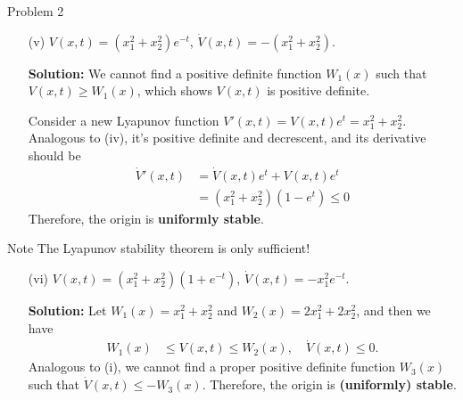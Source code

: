 \documentclass[8pt]{beamer}
\begin{document}
\begin{frame}[t]{Problem 2}
  \begin{itemize}
    \item[(v)] $V(x,t)=(x_1^2+x_2^2)e^{-t}$, $\dot V(x,t)=-(x_1^2+x_2^2)$.
    
    {\bf Solution:} We cannot find a positive definite function $W_1(x)$ such that $V(x,t) \ge W_1(x)$, which shows $V(x,t)$ is positive definite. 
    
    Consider a new Lyapunov function $V'(x,t)=V(x,t)e^{t}=x_1^2+x_2^2$. Analogous to (iv), it's positive definite and decrescent,
    and its derivative should be 
    \begin{align*}
        \dot V'(x,t)&=\dot V(x,t)e^{t}+V(x,t)e^{t}\\
        &=(x_1^2+x_2^2)(1-e^t)\le 0
    \end{align*}
    Therefore, the origin is \textbf{uniformly stable}.
  \end{itemize}
  \begin{block}{Note}
    The Lyapunov stability theorem is only sufficient!
  \end{block}
  \begin{itemize}
  \item[(vi)] $V(x,t)=(x_1^2+x_2^2)(1+e^{-t})$, $\dot V(x,t)=-x_1^2e^{-t}$.
    
    {\bf Solution:} Let $W_1(x)=x_1^2+x_2^2$ and $W_2(x)=2x_1^2+2x_2^2$, and then we have 
    \begin{align*}
        W_1(x) &\le V(x,t) \le W_2(x),\quad \dot V(x,t) \le 0.
    \end{align*}
    Analogous to (i), we cannot find a proper positive definite function $W_3(x)$ such that $\dot V(x,t) \le -W_3(x)$. Therefore, the origin is \textbf{(uniformly) stable}.
  \end{itemize}
\end{frame}
\end{document}
